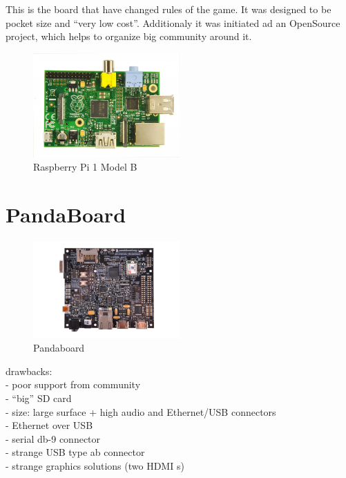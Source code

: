 \documentclass[printmode]{mgr}
\begin{document}
This is the board that have changed rules of the game.
It was designed to be pocket size and ``very low cost''.
Additionaly it was initiated ad an OpenSource project, which helps to organize big community around it.


\begin{figure}[htbp]
  \centering
    \includegraphics[width=0.5\textwidth]{raspberrypi-front.jpg}
  \caption{Raspberry Pi 1 Model B}
  \label{fig:devboard-raspberrypi}
\end{figure}

\section{PandaBoard}

\begin{figure}[htbp]
  \centering
    \includegraphics[width=0.5\textwidth]{pandaboard-front.png}
  \caption{Pandaboard}
  \label{fig:devboard-pandaboard}
\end{figure}

drawbacks:\\
- poor support from community\\
- ``big'' SD card\\
- size: large surface + high audio and Ethernet/USB connectors\\
- Ethernet over USB\\
- serial db-9 connector\\
- strange USB type ab connector\\
- strange graphics solutions (two HDMI s)\\
\end{document}
